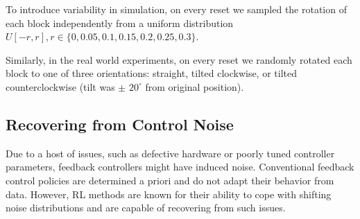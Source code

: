 To introduce variability in simulation, on every reset we sampled the rotation of each block independently from a uniform distribution $U[-r, r], r \in \{0, 0.05, 0.1, 0.15, 0.2, 0.25, 0.3\}$.

Similarly, in the real world experiments, on every reset we randomly rotated each block to one of three orientations: straight, tilted clockwise, or tilted counterclockwise (tilt was $\pm$  $20^{\circ}$ from original position).

\subsection{Recovering from Control Noise}

Due to a host of issues, such as defective hardware or poorly tuned controller parameters, feedback controllers might have induced noise. Conventional feedback control policies are determined a priori and do not adapt their behavior from data.
However, RL methods are known for their ability to cope with shifting noise distributions and are capable of recovering from such issues.

